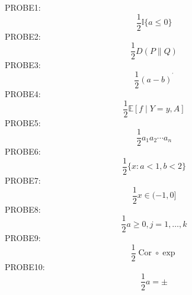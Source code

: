 \documentclass{article}
\begin{document}
PROBE1: \[ \frac{1}{2}\mathbb{I}\{a\leq 0\} \]
PROBE2: \[ \frac{1}{2}D(P\|Q) \]
PROBE3: \[ \frac{1}{2}(a-b)^{{}^{\prime}} \]
PROBE4: \[ \frac{1}{2}\mathbb{E}[f\mid Y=y,A] \]
PROBE5: \[ \frac{1}{2}a_{1}a_{2}\cdots a_{n} \]
PROBE6: \[ \frac{1}{2}\{x:a<1,b<2\} \]
PROBE7: \[ \frac{1}{2}x\in(-1,0] \]
PROBE8: \[ \frac{1}{2}a\geq 0,j=1,\ldots,k \]
PROBE9: \[ \frac{1}{2}\operatorname{Cor}\circ\exp \]
PROBE10: \[ \frac{1}{2}a=\pm \]
\end{document}
